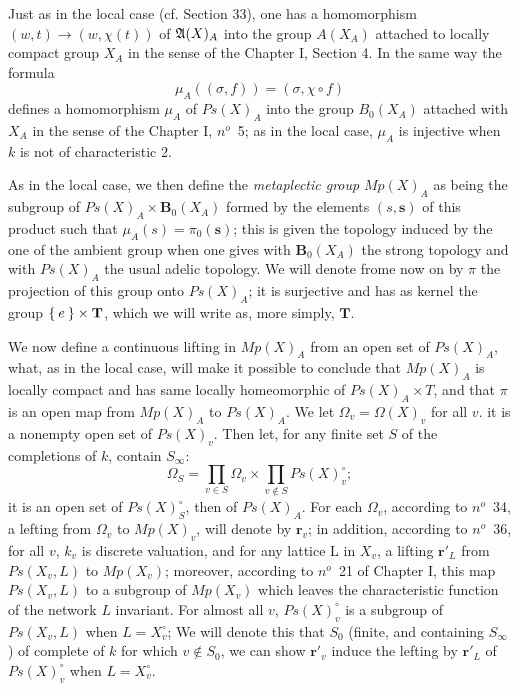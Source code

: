 \documentclass[12pt]{amsart}
\def\br{{\mathbf{r}}}
\newcounter{ssection}
\renewcommand{\subsection}{
  \addtocounter{ssection}{1}{\bf  \arabic{ssection}.\  }}
\begin{document}
Just as in the local case (cf. Section 33), one has a homomorphism
$(w,t)\to(w,\chi(t))$ of ${\mathfrak{A}}(X)_{A}$ into the group $A(X_{A})$
attached to locally compact group $X_{A}$ in the sense of the Chapter
I, Section 4. In the same way the formula\[
\mu_{A}((\sigma,f))=(\sigma,\chi\circ f)\]
defines a homomorphism $\mu_{A}$ of $Ps(X)_{A}$ into the group $B_{0}(X_{A})$
attached with $X_{A}$ in the sense of the Chapter I, $n^o$~5;
as in the local case, $\mu_{A}$ is injective when $k$ is not of
characteristic $2$.

As in the local case, we then define the \emph{metaplectic group}
$Mp(X)_{A}$ as being the subgroup of $Ps(X)_{A}\times\mathbf{B}_{0}(X_{A})$
formed by the elements $(s,\mathbf{s})$ of this product such that
$\mu_{A}(s)=\pi_{0}(\mathbf{s})$; this is given the topology induced
by the one of the ambient group when one gives with $\mathbf{B}_{0}(X_{A})$
the strong topology and with $Ps(X)_{A}$ the usual adelic topology.
We will denote frome now on by $\pi$ the projection of this group
onto $Ps(X)_{A}$; it is surjective and has as kernel the group $\Set{e}\times\mathbf{T}$,
which we will write as, more simply, $\mathbf{T}$.

\subsection{}
We now define a continuous lifting in $Mp(X)_A$ from an open set of 
$Ps(X)_A$,
what, as in the local case, will make it possible to conclude that $Mp(X)_A$ 
is locally compact and has same locally homeomorphic of $Ps(X)_A \times T$,
and that $\pi$ is 
an open map from $Mp(X)_A$ to  $Ps(X)_A$.
We let $\Omega_v = \Omega(X)_v$ for all $v$. 
it is a nonempty open set of $Ps(X)_v$. Then let, for any finite set $S$ of
the completions of $k$, contain $S_\infty$:
\[
\Omega_S=\prod_{v\in S} \Omega_v \times \prod_{v\notin S} Ps(X)_v^\circ;
\] 
it is an open set of $Ps(X)_S^\circ$, then of $Ps(X)_A$. For each $\Omega_v$, 
according to $n^o$~34, a lefting from $\Omega_v$ to $Mp(X)_v$, will denote by 
$\br_v$; in addition, according to $n^o$~36, for all $v$, $k_v$ is discrete valuation, and for any lattice L in $X_v$, a lifting $\br'_L$ from $Ps(X_v,L)$ to
$Mp(X_v)$; moreover, according to $n^o$~21 of Chapter I, 
this map $Ps(X_v, L)$ to a subgroup of $Mp(X_v)$ which leaves 
the characteristic function of the network $L$ invariant.
For almost all $v$, $Ps(X)_v^\circ$ is a subgroup of $Ps(X_v,L)$
 when $L =X_v^\circ$; We will denote this that $S_0$ 
(finite, and containing $S_\infty$) of complete 
of $k$ for which $v\notin S_0$, we can show $\br'_v$ induce
 the lefting by $\br'_L$ of
$Ps(X)_v^\circ$ when $L=X_v^\circ$.
\end{document}
